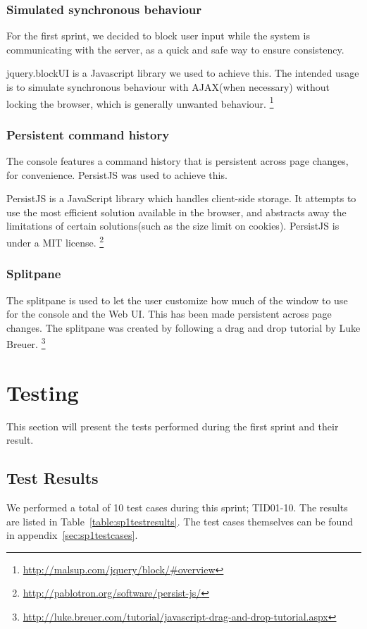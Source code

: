 \subsubsection{Simulated synchronous behaviour}
For the first sprint, we decided to block user input while the system is communicating with the server, as a quick and safe way to ensure consistency.

jquery.blockUI is a Javascript library we used to achieve this. The intended usage is to simulate synchronous behaviour with AJAX(when necessary) without locking the browser, which is generally unwanted behaviour.
\footnote{\url{http://malsup.com/jquery/block/\#overview}}

\subsubsection{Persistent command history}
The console features a command history that is persistent across page changes, for convenience. PersistJS was used to achieve this.

PersistJS is a JavaScript library which handles client-side storage. It attempts to use the most efficient solution available in the browser, and abstracts away the limitations of certain solutions(such as the size limit on cookies).
PersistJS is under a MIT license.
\footnote{\url{http://pablotron.org/software/persist-js/}}

\subsubsection{Splitpane}
The splitpane is used to let the user customize how much of the window to use for the console and the Web UI. This has been made persistent across page changes.
The splitpane was created by following a drag and drop tutorial by Luke Breuer.
\footnote{\url{http://luke.breuer.com/tutorial/javascript-drag-and-drop-tutorial.aspx}}



\section{Testing}
This section will present the tests performed during the first sprint and their result.

\subsection{Test Results}
We performed a total of 10 test cases during this sprint; TID01-10. The results are listed in Table~\ref{table:sp1testresults}. The test cases themselves can be found in appendix~\ref{sec:sp1testcases}.

